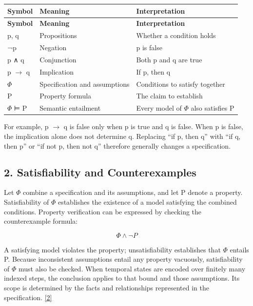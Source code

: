 \documentclass[11pt,a4paper]{article}
\begin{document}
\begingroup\small
\begin{longtable}{@{}>{\raggedright\arraybackslash}p{}>{\raggedright\arraybackslash}p{}>{\raggedright\arraybackslash}p{}@{}}
\toprule
\textbf{Symbol} & \textbf{Meaning} & \textbf{Interpretation} \\
\midrule\endfirsthead
\toprule
\textbf{Symbol} & \textbf{Meaning} & \textbf{Interpretation} \\
\midrule\endhead
\bottomrule\endfoot
p, q & Propositions & Whether a condition holds \\
¬p & Negation & p is false \\
p ∧ q & Conjunction & Both p and q are true \\
p \ensuremath{\rightarrow} q & Implication & If p, then q \\
\ensuremath{\Phi} & Specification and assumptions & Conditions to satisfy together \\
P & Property formula & The claim to establish \\
\ensuremath{\Phi} ⊨ P & Semantic entailment & Every model of \ensuremath{\Phi} also satisfies P \\
\end{longtable}
\endgroup

For example, p \ensuremath{\rightarrow} q is false only when p is true and q is false. When p is false, the implication alone does not determine q. Replacing “if p, then q” with “if q, then p” or “if not p, then not q” therefore generally changes a specification.\par

\subsection*{2. Satisfiability and Counterexamples}

Let \ensuremath{\Phi} combine a specification and its assumptions, and let P denote a property. Satisfiability of \ensuremath{\Phi} establishes the existence of a model satisfying the combined conditions. Property verification can be expressed by checking the counterexample formula:\par

\[\Phi \land \neg P\]

A satisfying model violates the property; unsatisfiability establishes that \ensuremath{\Phi} entails P. Because inconsistent assumptions entail any property vacuously, satisfiability of \ensuremath{\Phi} must also be checked. When temporal states are encoded over finitely many indexed steps, the conclusion applies to that bound and those assumptions. Its scope is determined by the facts and relationships represented in the specification. \href{\detokenize{https://theory.stanford.edu/~barrett/pubs/BT18.pdf}}{[2]}\par
\end{document}
